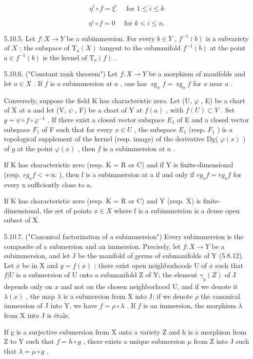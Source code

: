 \[
\eta^ {i} \circ f = \xi^ {i} \quad \text { for } 1 \leqslant i \leqslant k
\]

\[
\eta^ {i} \circ f = 0 \quad \text {   for   } k <   i \leqslant n.
\]

5.10.5. Let \(f: X \to Y\) be a subimmersion. For every \(b \in Y\) , \(f^{-1}(b)\) is a subvariety of \(X\) ; the subspace of \(\mathrm{T}_{a}(X)\) tangent to the submanifold \(f^{-1}(b)\) at the point \(a \in f^{-1}(b)\) is the kernel of \(\mathrm{T}_{a}(f)\) .

5.10.6. ("Constant rank theorem") Let \(f: X \to Y\) be a morphism of manifolds and let \(a \in X\) . If \(f\) is a subimmersion at \(a\) , one has \(\operatorname{rg}_{x} f = \operatorname{rg}_{a} f\) for \(x\) near \(a\) .

Conversely, suppose the field K has characteristic zero. Let (U, \(\varphi\) , E) be a chart of X at \(a\) and let (V, \(\psi\) , F) be a chart of Y at \(f(a)\) , with \(f(U) \subset V\) . Set \(g = \psi \circ f \circ \varphi^{-1}\) . If there exist a closed vector subspace \(E_{1}\) of E and a closed vector subspace \(F_{1}\) of F such that for every \(x \in U\) , the subspace \(E_{1}\) (resp. \(F_{1}\) ) is a topological supplement of the kernel (resp. image) of the derivative Dg( \(\varphi(x)\) ) of \(g\) at the point \(\varphi(x)\) , then \(f\) is a subimmersion at \(a\) .

If K has characteristic zero (resp. K = R or C) and if Y is finite-dimensional (resp. \(rg_{a}f < +\infty\) ), then f is a subimmersion at a if and only if \(rg_{x}f = rg_{a}f\) for every x sufficiently close to a.

If K has characteristic zero (resp. K = R or C) and Y (resp. X) is finite-dimensional, the set of points \(x \in X\) where f is a subimmersion is a dense open subset of X.

5.10.7. ("Canonical factorization of a subimmersion") Every subimmersion is the composite of a submersion and an immersion. Precisely, let \(f: X \to Y\) be a subimmersion, and let J be the manifold of germs of submanifolds of Y (5.8.12). Let \(x\) be in X and \(y = f(x)\) ; there exist open neighborhoods U of \(x\) such that \(f|U\) is a submersion of U onto a submanifold Z of Y; the element \(\gamma_y(Z)\) of J depends only on \(x\) and not on the chosen neighborhood U, and if we denote it \(\lambda(x)\) , the map \(\lambda\) is a submersion from X into J; if we denote \(\rho\) the canonical immersion of J into Y, we have \(f = \rho \circ \lambda\) . If \(f\) is an immersion, the morphism \(\lambda\) from X into J is étale.

If g is a surjective submersion from X onto a variety Z and h is a morphism from Z to Y such that \(f = h \circ g\) , there exists a unique submersion \(\mu\) from Z into J such that \(\lambda = \mu \circ g\) .

